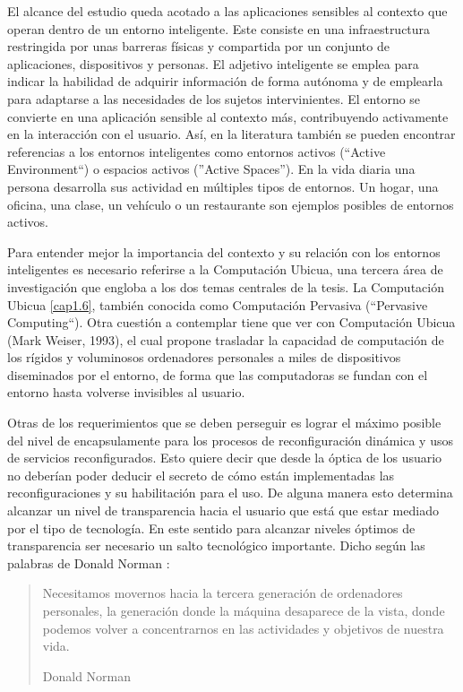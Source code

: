 {El alcance del estudio queda acotado a las aplicaciones sensibles al contexto
que operan dentro de un entorno inteligente. Este consiste en una
infraestructura restringida por unas barreras físicas y compartida por un
conjunto de aplicaciones, dispositivos y personas. El adjetivo inteligente se
emplea para indicar la habilidad de adquirir información de forma autónoma y de
emplearla para adaptarse a las necesidades de los sujetos intervinientes. El
entorno se convierte en una aplicación sensible al contexto más, contribuyendo
activamente en la interacción con el usuario. Así, en la literatura también se
pueden encontrar referencias a los entornos inteligentes como entornos activos
(``Active Environment``) o espacios activos (''Active Spaces''). En la vida
diaria una persona desarrolla sus actividad en múltiples tipos de entornos. Un
hogar, una oficina, una clase, un vehículo o un restaurante son ejemplos
posibles de entornos activos. 

Para entender mejor la importancia del contexto y su relación con los entornos
inteligentes es necesario referirse a la Computación Ubicua, una tercera área de
investigación que engloba a los dos temas centrales de la tesis. La Computación
Ubicua \ref{cap1.6}, también conocida como Computación Pervasiva (``Pervasive
Computing``). Otra cuestión a contemplar tiene que ver con Computación Ubicua
(Mark Weiser, 1993), el cual propone trasladar la capacidad de computación de
los rígidos y voluminosos ordenadores personales a miles de dispositivos
diseminados por el entorno, de forma que las computadoras se fundan con el
entorno hasta volverse invisibles al usuario.

Otras de los requerimientos que se deben perseguir es lograr el máximo
posible del nivel de encapsulamente para los procesos de reconfiguración
dinámica y usos de servicios reconfigurados. Esto quiere decir que desde la
óptica de los usuario no deberían poder deducir el secreto de cómo están
implementadas las reconfiguraciones y su habilitación para el uso. De alguna
manera esto determina alcanzar un nivel de transparencia hacia el usuario que
está que estar mediado por el tipo de tecnología. En este sentido para alcanzar
niveles óptimos de transparencia ser necesario un salto tecnológico
importante. Dicho según las palabras de Donald Norman \cite{cap1.196}:

\begin{quote}
Necesitamos movernos hacia la tercera generación de ordenadores
personales, la generación donde la máquina desaparece de la vista,
donde podemos volver a concentrarnos en las actividades y objetivos
de nuestra vida.
\begin{flushright} Donald Norman \end{flushright}
\end{quote} 

}
